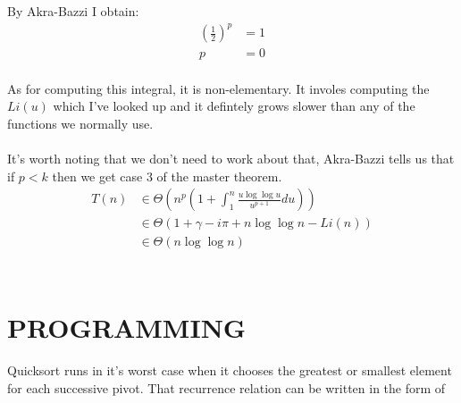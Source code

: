 \documentclass[paper=a4,fontsize=11pt]{article}
\begin{document}
\begin{enumerate}
By Akra-Bazzi I obtain:
\begin{align*}
    (\frac{1}{2})^{p}&=1\\
    p&=0
\end{align*}\\
As for computing this integral, it is non-elementary. It involes computing the $Li(u)$ which I've looked up and it defintely grows slower than any of the functions we normally use.\\\\
It's worth noting that we don't need to work about that, Akra-Bazzi tells us that if $p<k$ then we get case 3 of the master theorem.
\begin{align*}
    T(n) &\in \Theta(n^{p}(1+\int_{1}^{n}{\frac{u\log{\log{u}}}{u^{p+1}}du}))\\
    &\in \Theta(1 + \gamma - i \pi + n\log{\log{n}} - Li(n))\\
    &\in \Theta(n\log{\log{n}})\\
\end{align*}\\
\end{enumerate}
\section{PROGRAMMING}
Quicksort runs in it's worst case when it chooses the greatest or smallest element for each successive pivot. That recurrence relation can be written in the form of 
\end{document}
